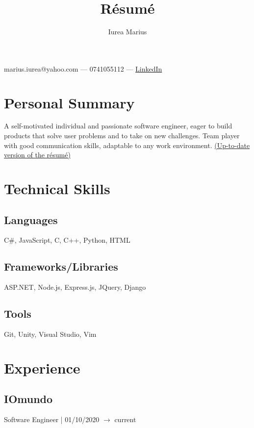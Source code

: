 \documentclass[a4paper,hidelinks,8pt]{article}
\begin{document}
\title{R\'esum\'e}
\author{Iurea Marius}
\renewcommand{\maketitle}
{
\begin{center}
        {\huge\bfseries
        \thetitle

        \theauthor}

        marius.iurea@yahoo.com --- 0741055112 --- \href{https://www.linkedin.com/in/marius-iurea-49b7021b5/}{LinkedIn}

        \end{center}
}

\maketitle

\section{Personal Summary}
A self-motivated individual and passionate software engineer, eager to build products that solve user problems and to take on new challenges.
Team player with good communication skills, adaptable to any work environment. \href{https://github.com/IureaMarius/Resume/blob/master/Resume.pdf}{(Up-to-date version of the r\'esum\'e)}
\section{Technical Skills}
\subsection{Languages}
C\#, JavaScript, C, C++, Python, HTML
\subsection{Frameworks/Libraries}
 ASP.NET, Node.js, Express.js, JQuery, Django
\subsection{Tools}
Git, Unity, Visual Studio, Vim
\section{Experience}

\subsection{IOmundo}Software Engineer | 01/10/2020 $\rightarrow$ current
\end{document}
